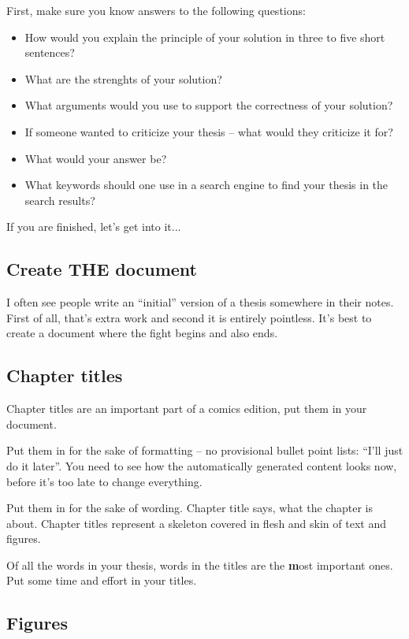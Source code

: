 First, make sure you know answers to the following questions:
\begin{itemize}
  \item{How would you explain the principle of your solution in three to five short sentences?}
  \item{What are the strenghts of your solution?}
  \item{What arguments would you use to support the correctness of your solution?}
  \item{If someone wanted to criticize your thesis -- what would they criticize it for?}
  \item{What would your answer be?}
  \item{What keywords should one use in a search engine to find your thesis in the search results?}
\end{itemize}

If you are finished, let's get into it...

\subsection*{Create THE document}

I often see people write an ``initial'' version of a thesis somewhere in their notes. First of all, that's extra work and second it is entirely pointless. It's best to create a document where the fight begins and also ends.

\subsection*{Chapter titles}

Chapter titles are an important part of a comics edition, put them in your document.

Put them in for the sake of formatting -- no provisional bullet point lists: ``I'll just do it later''. You need to see how the automatically generated content looks now, before it's too late to change everything.

Put them in for the sake of wording. Chapter title says, what the chapter is about. Chapter titles represent a skeleton covered in flesh and skin of text and figures.

Of all the words in your thesis, words in the titles are the \textbf most important ones\rm. Put some time and effort in your titles.

\subsection*{Figures}

